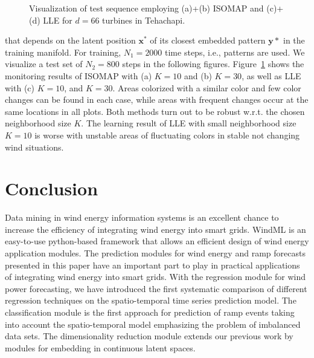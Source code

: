 \documentclass[10pt, conference, compsocconf]{IEEEtran}
\begin{document}
\begin{figure}[h]
\begin{center}
\caption{\label{fig:monitor}Visualization of test sequence employing (a)+(b) ISOMAP and (c)+(d) LLE for $d=66$ turbines in Tehachapi.}
\end{center}
\end{figure}
that depends on the latent position $\mathbf{x}^*$ of its closest embedded pattern $\mathbf{y}*$ in the training manifold. For training, $N_1=2000$ time steps, i.e., patterns are used. We visualize a test set of $N_2=800$ steps in the following figures. Figure~\ref{fig:monitor} shows the monitoring results of ISOMAP with (a) $K=10$ and (b) $K=30$, as well as LLE with (c) $K=10$, and $K=30$. Areas colorized with a similar color and few color changes can be found in each case, while areas with frequent changes occur at the same locations in all plots. Both methods turn out to be robust w.r.t. the chosen neighborhood size $K$. The learning result of LLE with small neighborhood size $K=10$ is worse with unstable areas of fluctuating colors in stable not changing wind situations. 


\section{Conclusion}
\label{sec:cons}

Data mining in wind energy information systems is an excellent chance to increase the efficiency of integrating wind energy into smart grids. WindML is an easy-to-use python-based framework that allows an efficient design of wind energy application modules. The prediction modules for wind energy and ramp forecasts presented in this paper have an important part to play in practical applications of integrating wind energy into smart grids. With the regression module for wind power forecasting, we have introduced  the first systematic comparison of different regression techniques on the spatio-temporal time series prediction model. The classification module is the first approach for prediction of ramp events taking into account the spatio-temporal model emphasizing the problem of imbalanced data sets. The dimensionality reduction module extends our previous work by modules for embedding in continuous latent spaces.
\end{document}
